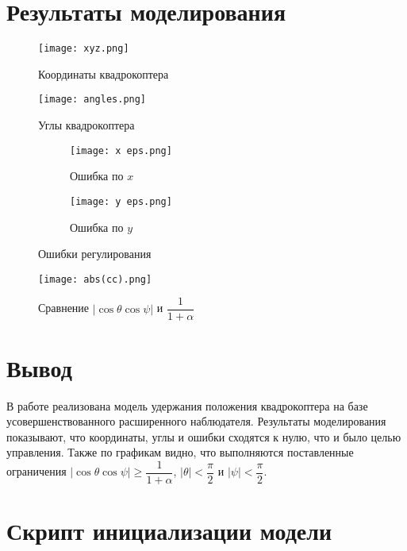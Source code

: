 \documentclass[14pt]{extarticle}
\begin{document}
    \section*{Результаты моделирования}

    \begin{figure}[H]
        \centering
        \texttt{[image: xyz.png]}
        \caption{Координаты квадрокоптера}
        \label{pic:xyz}
    \end{figure}

    \begin{figure}[H]
        \centering
        \texttt{[image: angles.png]}
        \caption{Углы квадрокоптера}
        \label{pic:angles}
    \end{figure}

    \begin{figure}[H]
        \centering
        \begin{subfigure}{0.49\textwidth}
            \texttt{[image: x eps.png]}
            \caption{Ошибка по $x$}
        \end{subfigure}
        \begin{subfigure}{0.49\textwidth}
            \texttt{[image: y eps.png]}
            \caption{Ошибка по $y$}
        \end{subfigure}
        \caption{Ошибки регулирования}
        \label{pic:eps}
    \end{figure}

    \begin{figure}[H]
        \centering
        \texttt{[image: abs(cc).png]}
        \caption{Сравнение $\left| \cos\theta\cos\psi \right|$ и $\dfrac{1}{1+\alpha}$}
        \label{pic:abs(cc)}
    \end{figure}


    \section*{Вывод}
    В работе реализована модель удержания положения квадрокоптера на базе усовершенствованного расширенного наблюдателя.
    Результаты моделирования показывают, что координаты, углы и ошибки сходятся к нулю, что и было целью управления.
    Также по графикам видно, что выполняются поставленные ограничения $\left| \cos\theta\cos\psi \right| \ge \dfrac{1}{1+\alpha}$,
    $\left| \theta \right| < \dfrac{\pi}{2}$ и $\left| \psi \right| < \dfrac{\pi}{2}$.

    \appendix
    \renewcommand{\thesection}{\Asbuk{section}}
    \section{Скрипт инициализации модели}\label{code:given}
\end{document}
